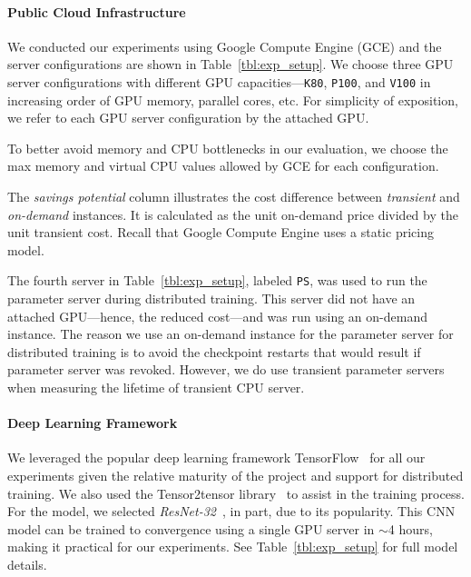 \paragraph{Public Cloud Infrastructure} 

We conducted our experiments using Google Compute Engine (GCE) and the server
configurations are shown in Table~\ref{tbl:exp_setup}. We choose three GPU server
configurations with different GPU capacities---\texttt{K80}, \texttt{P100}, and
\texttt{V100} in increasing order of GPU memory, parallel cores, etc.   For simplicity of
exposition, we refer to each GPU server configuration by the attached  GPU.

To better avoid memory and CPU bottlenecks in our evaluation, we choose the max
memory and virtual CPU values allowed by GCE for each
configuration. 

The \emph{savings potential} column illustrates the cost difference between 
\emph{transient} and \emph{on-demand} instances.  It is calculated as the unit on-demand price divided
by the unit transient cost. Recall that Google Compute
Engine uses a static pricing model.

The fourth server in Table~\ref{tbl:exp_setup}, labeled \texttt{PS}, was used
to run the parameter server during distributed training. This server did not
have an attached GPU---hence, the reduced cost---and was run using an
on-demand instance.  The reason we use an on-demand instance for the parameter
server for distributed training is to avoid the checkpoint restarts that would result if
parameter server was revoked. %
However, we do use transient parameter servers
when measuring the lifetime of transient CPU server. 

\paragraph{Deep Learning Framework} 

We leveraged the popular deep learning framework TensorFlow~\cite{tensorflow} for all our
experiments given the relative maturity of the project and support for distributed training. 
We also used the Tensor2tensor library~\cite{tensor2tensor} to assist in the training process. 
For the model, we selected  \emph{ResNet-32}~\cite{resnet}, in part, due to its popularity. This 
CNN model can be trained to convergence using a single GPU server in $\sim$4
hours, making it practical for our experiments.  See Table~\ref{tbl:exp_setup}
for full model details.  

